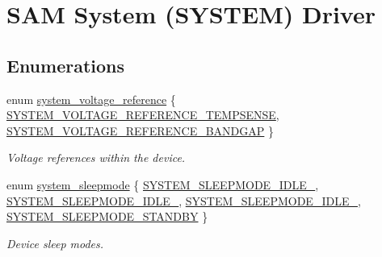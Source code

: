 \hypertarget{group__asfdoc__sam0__system__group}{}\section{S\+AM System (S\+Y\+S\+T\+EM) Driver}
\label{group__asfdoc__sam0__system__group}
\subsection*{Enumerations}
\begin{DoxyCompactItemize}
\item 
enum \mbox{\hyperlink{group__asfdoc__sam0__system__group_gae3ed274224184cfb1d173b146bd72170}{system\+\_\+voltage\+\_\+reference}} \{ \mbox{\hyperlink{group__asfdoc__sam0__system__group_ggae3ed274224184cfb1d173b146bd72170aec400f1f06b7017c7fdca8e2c8205e36}{S\+Y\+S\+T\+E\+M\+\_\+\+V\+O\+L\+T\+A\+G\+E\+\_\+\+R\+E\+F\+E\+R\+E\+N\+C\+E\+\_\+\+T\+E\+M\+P\+S\+E\+N\+SE}}, 
\mbox{\hyperlink{group__asfdoc__sam0__system__group_ggae3ed274224184cfb1d173b146bd72170adc69630503aa676207e9183c388698dc}{S\+Y\+S\+T\+E\+M\+\_\+\+V\+O\+L\+T\+A\+G\+E\+\_\+\+R\+E\+F\+E\+R\+E\+N\+C\+E\+\_\+\+B\+A\+N\+D\+G\+AP}}
 \}
\begin{DoxyCompactList}\small\item\em Voltage references within the device. \end{DoxyCompactList}\item 
enum \mbox{\hyperlink{group__asfdoc__sam0__system__group_ga6a75333c00b88a5da14eb9ba5ead2be1}{system\+\_\+sleepmode}} \{ \mbox{\hyperlink{group__asfdoc__sam0__system__group_gga6a75333c00b88a5da14eb9ba5ead2be1a273e166ed48d972d58d5d6e5466b7977}{S\+Y\+S\+T\+E\+M\+\_\+\+S\+L\+E\+E\+P\+M\+O\+D\+E\+\_\+\+I\+D\+L\+E\+\_}}, 
\mbox{\hyperlink{group__asfdoc__sam0__system__group_gga6a75333c00b88a5da14eb9ba5ead2be1ada43603665b981de310962b380ff2b62}{S\+Y\+S\+T\+E\+M\+\_\+\+S\+L\+E\+E\+P\+M\+O\+D\+E\+\_\+\+I\+D\+L\+E\+\_}}, 
\mbox{\hyperlink{group__asfdoc__sam0__system__group_gga6a75333c00b88a5da14eb9ba5ead2be1a7b03cf170b0a7b1b2335a270fbcb5df3}{S\+Y\+S\+T\+E\+M\+\_\+\+S\+L\+E\+E\+P\+M\+O\+D\+E\+\_\+\+I\+D\+L\+E\+\_}}, 
\mbox{\hyperlink{group__asfdoc__sam0__system__group_gga6a75333c00b88a5da14eb9ba5ead2be1a446eddfe38bc09277ed1863ffac261e3}{S\+Y\+S\+T\+E\+M\+\_\+\+S\+L\+E\+E\+P\+M\+O\+D\+E\+\_\+\+S\+T\+A\+N\+D\+BY}}
 \}
\begin{DoxyCompactList}\small\item\em Device sleep modes. \end{DoxyCompactList}\item 

\end{DoxyCompactItemize}
